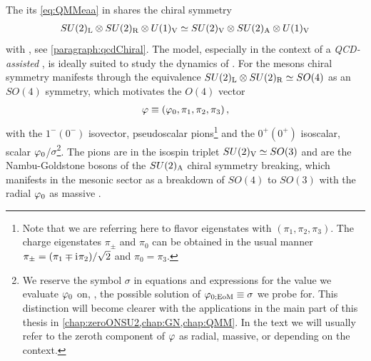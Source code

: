 The \qmm{} \dash{} its \eaa{} \eqref{eq:QMMeaa} in \lpa{} \dash{} shares the chiral symmetry
\begin{align}
SU(2)_{\mathrm{L}}\otimes SU(2)_{\mathrm{R}}\otimes U(1)_{\mathrm{V}} \simeq SU(2)_{\mathrm{V}}\otimes SU(2)_{\mathrm{A}}\otimes U(1)_{\mathrm{V}}
\label{eq:QMMchiral}
\end{align}
with \qcd{}, see \cref{paragraph:qcdChiral}.
The model, especially in the context of a \textit{QCD-assisted} \loeft{}, is ideally suited to study the dynamics of \csb{}.
For the mesons chiral symmetry manifests through the equivalence $SU(2)_{\mathrm{L}}\otimes SU(2)_{\mathrm{R}} \simeq SO(4)$ as an $SO(4)$ symmetry, which motivates the $O(4)$ vector
\begin{align}
\varphi \equiv (\varphi_0,\pi_1,\pi_2,\pi_3)\,,
\label{eq:phiVector}
\end{align}
with the $1^-(0^-)$ isovector, pseudoscalar pions\footnote{%
	Note that we are referring here to flavor eigenstates with $(\pi_1,\pi_2,\pi_3)$.
	The charge eigenstates $\pi_\pm$ and $\pi_0$ can be obtained in the usual manner $\pi_\pm=(\pi_1\mp \mathrm{i}\mkern1mu \pi_2)/\sqrt{2}$ and $\pi_{0}=\pi_3$.
} and the $0^+(0^+)$ isoscalar, scalar $\varphi_0$/$\sigma$\footnote{
	We reserve the symbol $\sigma$ in equations and expressions for the value we evaluate $\varphi_0$ on, \ie{}, the possible solution of $\varphi_{0;\mathrm{EoM}}\equiv\sigma$ we probe for.
	This distinction will become clearer with the applications in the main part of this thesis in \cref{chap:zeroONSU2,chap:GN,chap:QMM}.
	In the text we will usually refer to the zeroth component of $\varphi$ as radial, massive, or \sigmaMode{} depending on the context.
}.
The pions are in the isospin triplet $SU(2)_{\mathrm{V}}\simeq SO(3)$ and are the Nambu-Goldstone bosons of the $SU(2)_{\mathrm{A}}$ chiral symmetry breaking, which manifests in the mesonic sector as a breakdown of $SO(4)$ to $SO(3)$ with the radial $\varphi_0$ as massive \sigmaMode{}.

